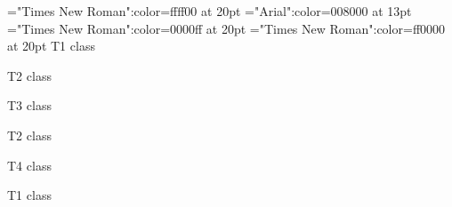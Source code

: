 \font\tdta="Times New Roman":color=ffff00 at 20pt
\font\tctbta="Arial":color=008000 at 13pt
\font\tbta="Times New Roman":color=0000ff at 20pt
\font\ta="Times New Roman":color=ff0000 at 20pt
\ta T1 class 

\tbta T2 class 

\tctbta T3 class 

\tbta T2 class 

\tdta T4 class 

\ta T1 class 


\bye
